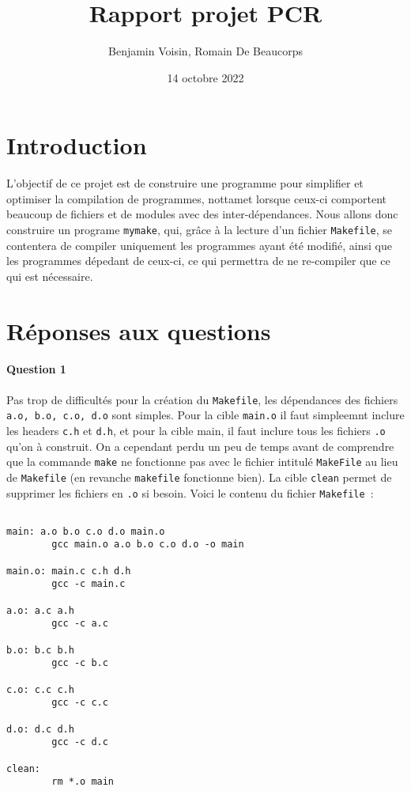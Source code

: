 \documentclass{article}
\title{Rapport projet PCR}
\author{Benjamin Voisin, Romain De Beaucorps}
\date{14 octobre 2022}
\begin{document}
\maketitle

\section{Introduction}

L’objectif de ce projet est de construire une programme pour simplifier et optimiser la compilation de programmes, nottamet lorsque ceux-ci comportent beaucoup de fichiers et de modules avec des inter-dépendances. Nous allons donc construire un programe \texttt{mymake}, qui, grâce à la lecture d’un fichier \texttt{Makefile}, se contentera de compiler uniquement les programmes ayant été modifié, ainsi que les programmes dépedant de ceux-ci, ce qui permettra de ne re-compiler que ce qui est nécessaire.

\section{Réponses aux questions}

\paragraph{Question 1} Pas trop de difficultés pour la création du \texttt{Makefile}, les dépendances des fichiers \texttt{a.o, b.o, c.o, d.o} sont simples. Pour la cible \texttt{main.o} il faut simpleemnt inclure les headers \texttt{c.h} et \texttt{d.h}, et pour la cible main, il faut inclure tous les  fichiers \texttt{.o} qu’on à construit. On a cependant perdu un peu de temps avant de comprendre que la commande \texttt{make} ne fonctionne pas avec le fichier intitulé \texttt{MakeFile} au lieu de \texttt{Makefile} (en revanche \texttt{makefile} fonctionne bien). La cible \texttt{clean} permet de supprimer les fichiers en \texttt{.o} si besoin. Voici le contenu du fichier \texttt{Makefile}~:

\begin{verbatim}

main: a.o b.o c.o d.o main.o 
        gcc main.o a.o b.o c.o d.o -o main

main.o: main.c c.h d.h
        gcc -c main.c

a.o: a.c a.h
        gcc -c a.c

b.o: b.c b.h 
        gcc -c b.c

c.o: c.c c.h
        gcc -c c.c

d.o: d.c d.h
        gcc -c d.c

clean:
        rm *.o main

\end{verbatim}
\end{document}
